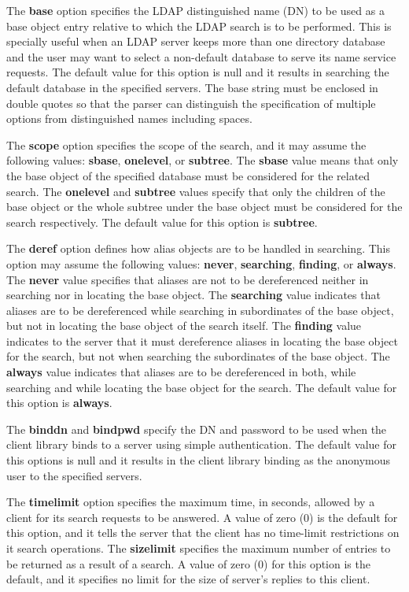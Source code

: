 The {\bf base} option specifies the LDAP distinguished name (DN) to be
used as a base object entry relative to which the LDAP search is to be
performed. This is specially useful when an LDAP server
keeps more than one directory database and the user may want to select
a non-default database to serve its name service requests.
The default value for this option is null and it results in searching
the default database in the specified servers. The base string must be
enclosed in double quotes so that the parser can distinguish the
specification of multiple options from distinguished names including
spaces.

The {\bf scope} option specifies the scope of the search, and it may
assume the following values: {\bf sbase}, {\bf onelevel}, or 
{\bf subtree}. The {\bf sbase} value means that only the base object
of the specified database must be considered for the related search. 
The {\bf onelevel} and {\bf subtree} values specify that only the
children of the base object or the whole subtree under the base object
must be considered for the search respectively. The default
value for this option is {\bf subtree}.

The {\bf deref} option defines how alias objects are to be handled in
searching. This option may assume the following values: {\bf never},
{\bf searching}, {\bf finding}, or {\bf always}. The {\bf never} value
specifies that aliases are not to be dereferenced neither in searching
nor in locating the base object. The {\bf searching} value indicates
that aliases are to be dereferenced while searching in subordinates of
the base object, but not in locating the base object of the search
itself. The  {\bf finding} value indicates to the server that it must
dereference aliases in locating the base object for the search, but not
when searching the subordinates of the base object. The {\bf always} 
value indicates that aliases are to be dereferenced in both, while 
searching and while locating the base object for the search. The
default value for this option is {\bf always}.

The {\bf binddn} and {\bf bindpwd} specify the DN and password to be
used when the client library binds to a server using simple
authentication. The default value for this options is null and it
results in the client library binding as the anonymous user to the
specified servers.

The {\bf timelimit} option specifies the maximum time, in seconds,
allowed by a client for its search requests to be answered.
A value of zero (0) is the default for this option, and it tells the
server that the client has no time-limit restrictions on it search
operations.  The {\bf sizelimit} specifies the maximum number of
entries to be returned as a result of a search. A value of zero (0)
for this option is the default, and it specifies no limit for the size of
server's replies to this client.

